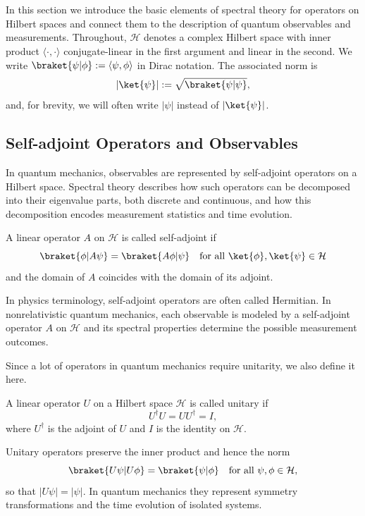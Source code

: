 \section{\filetotitle}\label{sec:spectral_theory_in_hilbert_spaces}
In this section we introduce the basic elements of spectral theory for operators on Hilbert spaces and connect them to the description of quantum observables and measurements. Throughout, $\mathcal{H}$ denotes a complex Hilbert space with inner product $\langle\cdot,\cdot\rangle$ conjugate-linear in the first argument and linear in the second. We write $\braket{\psi|\phi}:=\langle\psi,\phi\rangle$ in Dirac notation. The associated norm is
\begin{equation}
\lvert\ket{\psi}\rvert := \sqrt{\braket{\psi|\psi}},
\end{equation}
and, for brevity, we will often write $\lvert\psi\rvert$ instead of $\lvert\ket{\psi}\rvert$.
\subsection{Self-adjoint Operators and Observables}\label{sec:self_adjoint_operators_and_observables}
In quantum mechanics, observables are represented by self-adjoint operators on a Hilbert space. Spectral theory describes how such operators can be decomposed into their eigenvalue parts, both discrete and continuous, and how this decomposition encodes measurement statistics and time evolution.
\begin{definition}
A linear operator $A$ on $\mathcal{H}$ is called self-adjoint if
\begin{equation}
\braket{\phi|A\psi}=\braket{A\phi|\psi}\quad\text{for all }\ket{\phi},\ket{\psi}\in\mathcal{H}
\end{equation}
and the domain of $A$ coincides with the domain of its adjoint.
\end{definition}
In physics terminology, self-adjoint operators are often called Hermitian. In nonrelativistic quantum mechanics, each observable is modeled by a self-adjoint operator $A$ on $\mathcal{H}$ and its spectral properties determine the possible measurement outcomes.

Since a lot of operators in quantum mechanics require unitarity, we also define it here.
\begin{definition}
A linear operator $U$ on a Hilbert space $\mathcal{H}$ is called unitary if
\begin{equation}
U^\dagger U=U U^\dagger=I,
\end{equation}
where $U^\dagger$ is the adjoint of $U$ and $I$ is the identity on $\mathcal{H}$.
\end{definition}
Unitary operators preserve the inner product and hence the norm
\begin{equation}
\braket{U\psi\vert U\phi}=\braket{\psi\vert\phi}\quad\text{for all }\psi,\phi\in\mathcal{H},
\end{equation}
so that $\lvert U\psi\rvert=\lvert\psi\rvert$. In quantum mechanics they represent symmetry
transformations and the time evolution of isolated systems.

